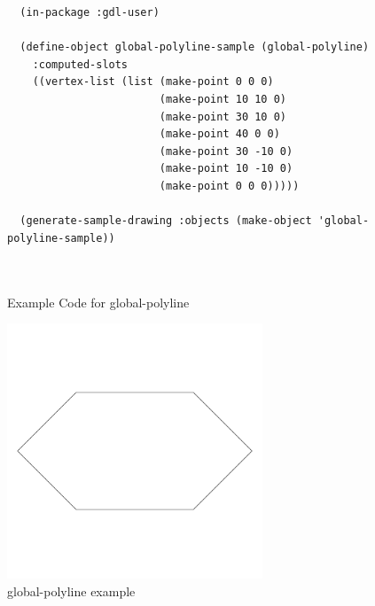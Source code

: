\documentclass [11pt]{book}
\begin{document}
\begin{itemize}
\begin{description}
\end{description}




\begin{figure}
\begin{lrbox}{\boxedverb}
\begin{minipage}{\linewidth}
{\small

\begin{verbatim}
  (in-package :gdl-user)

  (define-object global-polyline-sample (global-polyline)
    :computed-slots
    ((vertex-list (list (make-point 0 0 0)
                        (make-point 10 10 0)
                        (make-point 30 10 0)
                        (make-point 40 0 0)
                        (make-point 30 -10 0)
                        (make-point 10 -10 0)
                        (make-point 0 0 0)))))
  
  (generate-sample-drawing :objects (make-object 'global-polyline-sample))

  
\end{verbatim}}
\end{minipage}
\end{lrbox}
\fbox{\usebox{\boxedverb}}

\caption{Example Code for global-polyline}

\label{fig:example-code-global-polyline}

\end{figure}

\begin{figure}
\begin{center}
\includegraphics[width=3in,height=3in]{../images/example-global-polyline.pdf}
\end{center}

\caption{global-polyline example}


\end{figure}
\end{itemize}
\end{document}
